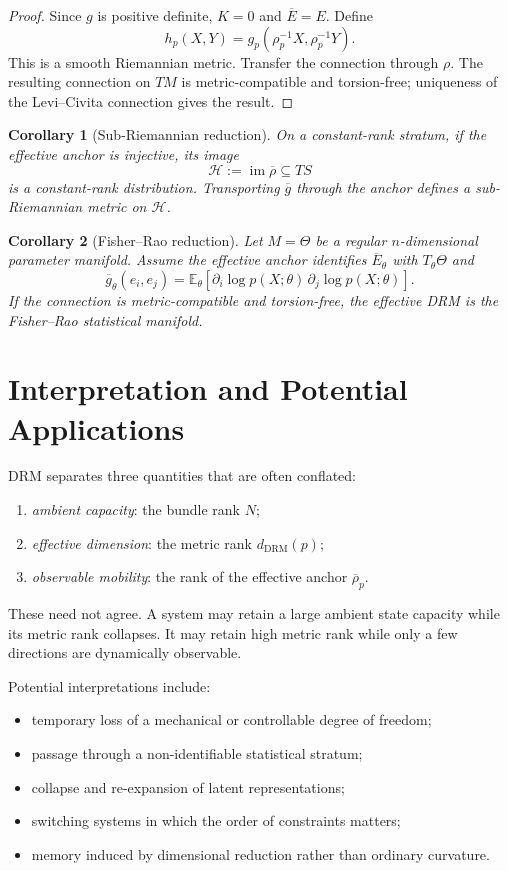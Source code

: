 \documentclass[11pt]{article}
\newtheorem{corollary}{Corollary}[section]
\newcommand{\im}{\operatorname{im}}
\begin{document}
\begin{proof}
Since $g$ is positive definite, $K=0$ and $\overline E=E$. Define
\[
h_p(X,Y)=g_p(\rho_p^{-1}X,\rho_p^{-1}Y).
\]
This is a smooth Riemannian metric. Transfer the connection through $\rho$.
The resulting connection on $TM$ is metric-compatible and torsion-free;
uniqueness of the Levi--Civita connection gives the result.
\end{proof}

\begin{corollary}[Sub-Riemannian reduction]
On a constant-rank stratum, if the effective anchor is injective, its image
\[
\mathcal H:=\im\overline\rho\subseteq TS
\]
is a constant-rank distribution. Transporting $\overline g$ through the
anchor defines a sub-Riemannian metric on $\mathcal H$.
\end{corollary}

\begin{corollary}[Fisher--Rao reduction]
Let $M=\Theta$ be a regular $n$-dimensional parameter manifold. Assume the
effective anchor identifies $\overline E_\theta$ with $T_\theta\Theta$ and
\[
\overline g_\theta(e_i,e_j)
=\mathbb E_\theta\!\left[
\partial_i\log p(X;\theta)\,
\partial_j\log p(X;\theta)
\right].
\]
If the connection is metric-compatible and torsion-free, the effective DRM is
the Fisher--Rao statistical manifold.
\end{corollary}

\section{Interpretation and Potential Applications}

DRM separates three quantities that are often conflated:
\begin{enumerate}
\item \emph{ambient capacity}: the bundle rank $N$;
\item \emph{effective dimension}: the metric rank $d_{\mathrm{DRM}}(p)$;
\item \emph{observable mobility}: the rank of the effective anchor
$\overline\rho_p$.
\end{enumerate}

These need not agree. A system may retain a large ambient state capacity while
its metric rank collapses. It may retain high metric rank while only a few
directions are dynamically observable.

Potential interpretations include:
\begin{itemize}
\item temporary loss of a mechanical or controllable degree of freedom;
\item passage through a non-identifiable statistical stratum;
\item collapse and re-expansion of latent representations;
\item switching systems in which the order of constraints matters;
\item memory induced by dimensional reduction rather than ordinary curvature.
\end{itemize}
\end{document}
